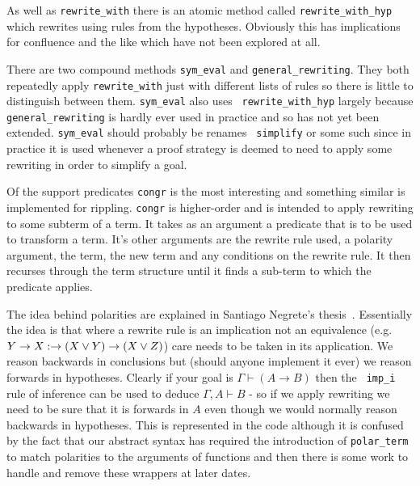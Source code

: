 \begin{description}
  As well as {\tt rewrite\_with} there is an
  atomic method called {\tt rewrite\_with\_hyp} which rewrites using
  rules from the hypotheses.  Obviously this has implications for
  confluence and the like which have not been explored at all.
  
  There are two compound methods {\tt sym\_eval} and
  {\tt general\_rewriting}.  They both
  repeatedly apply {\tt rewrite\_with} just with
  different lists of rules so there is little to distinguish between
  them.  {\tt sym\_eval} also uses {\tt
    rewrite\_with\_hyp} largely because {\tt
    general\_rewriting} is hardly ever used in practice and so has not
  yet been extended.  {\tt sym\_eval} should probably be renames {\tt
    simplify} or some such since in practice it is used whenever a
  proof strategy is deemed to need to apply some rewriting in order to
  simplify a goal.
  
  Of the support predicates {\tt congr} is the most
  interesting and something similar is implemented for
  rippling.  {\tt congr} is higher-order and is
  intended to apply rewriting to some subterm of a term.  It takes as
  an argument a predicate that is to be used to transform a term.
  It's other arguments are the rewrite rule used,
  a polarity argument, the term, the new term and any
  conditions on the rewrite rule.  It then recurses through the term
  structure until it finds a sub-term to which the predicate applies.

  
  The idea behind polarities are explained in Santiago
  Negrete's thesis~\cite{negrete-thesis}.  Essentially the idea is
  that where a rewrite rule is an implication not
  an equivalence (e.g. $Y \rightarrow X :\rightarrow (X \vee Y)
  \rightarrow (X \vee Z)$) care needs to be taken in its application.
  We reason backwards in conclusions but (should anyone implement it
  ever) we reason forwards in hypotheses.  Clearly if your goal is
  $\Gamma \vdash (A \rightarrow B)$ then the {\tt
    imp\_i} rule of inference can be used to deduce
  $\Gamma, A \vdash B$ - so if we apply rewriting we need to be sure
  that it is forwards in $A$ even though we would normally reason
  backwards in hypotheses.  This is represented in the code although
  it is confused by the fact that our abstract syntax has required the
  introduction of {\tt polar\_term} to match
  polarities to the arguments of functions and then there is some work
  to handle and remove these wrappers at later dates.
  

\end{description}
